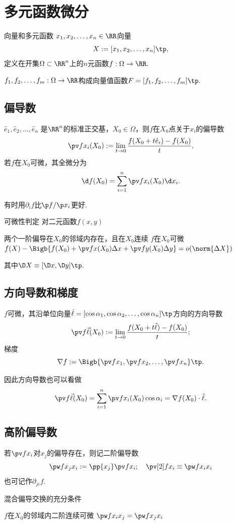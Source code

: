 \chapter{多元函数微分}
\begin{definition}{向量和多元函数}{}
	$x_1,x_2,\ldots,x_n\in\RR$向量
	\[
		X:=[x_1,x_2,\ldots,x_n]\tp,
	\]
	定义在开集$\Omega\subset\RR^n$上的$n$元函数$f:\Omega\to\RR.$
\end{definition}
$f_1,f_2,\ldots,f_m:\Omega\to\RR$构成向量值函数$F=[f_1,f_2,\ldots,f_m]\tp.$
\section{偏导数}
\begin{definition}{}{}
	$\hat e_1,\hat e_2,\ldots,\hat e_n$ 是$\RR^n$的标准正交基，$X_0\in\Omega$，则$f$在$X_0$点关于$x_i$的偏导数
	\[
		\pv f{x_i}(X_0):=\lim_{t\to 0}\frac{f(X_0+t\hat e_i)-f(X_0)}t,
	\]
	若$f$在$X_0$可微，其全微分为
	\begin{align}
		\d f(X_0)=\sum_{i=1}^n\pv f{x_i}(X_0)\d x_i.
	\end{align}
\end{definition}
有时用$\partial_if$比$\p f/\p x_i$更好.
\begin{theorem}{可微性判定}{}
	对二元函数$f(x,y)$
	\begin{center}
		两个一阶偏导在$X_0$的邻域内存在，且在$X_0$连续
		\vimplies
		$f$在$X_0$可微
		\viff
		$f(X)-\Bigb{f(X_0)+\pv fx(X_0)\Delta x+\pv fy(X_0)\Delta y}=o(\norm{\Delta X})$
	\end{center}
	其中$\D X\equiv[\D x,\D y]\tp.$
\end{theorem}
\section{方向导数和梯度}
\begin{definition}{}{}
	$f$可微，其沿单位向量$\hat \ell=[\cos\alpha_1,\cos\alpha_2,\ldots,\cos\alpha_n]\tp$方向的方向导数 %
	\[
		\pv f{\vec \ell}(X_0):=\lim_{t\to 0}\frac{f(X_0+t\hat \ell)-f(X_0)}t;
	\]
	梯度
	\[
		\nabla f:=\Bigb{\pv f{x_1},\pv f{x_2},\ldots,\pv f{x_n}}\tp.
	\]
\end{definition}
因此方向导数也可以看做
\begin{align}
	\pv f{\vec \ell}(X_0)=\sum_{i=1}^n\pv f{x_i}(X_0)\cos\alpha_i=\nabla f(X_0)\cdot\hat \ell.
\end{align}
\section{高阶偏导数}
\begin{definition}{}{}
	若$\pv f{x_i}$对$x_j$的偏导存在，则记二阶偏导数
	\[
		\pw f{x_j}{x_i}:=\pp{x_j}\pv f{x_i};\quad \pv[2]f{x_i}\equiv\pw f{x_i}{x_i}
	\]
	也可记作$\partial_{ji}f.$
\end{definition}
\begin{theorem}{混合偏导交换的充分条件}{}
	\begin{center}
		$f$在$X_0$的邻域内二阶连续可微
		\vimplies
		$\pw f{x_i}{x_j}=\pw f{x_j}{x_i}$
	\end{center}
\end{theorem}
